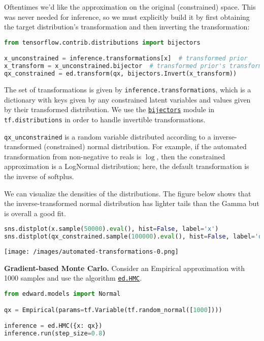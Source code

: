 Oftentimes we'd like the approximation on the original (constrained)
space. This was never needed for inference, so we must explicitly
build it by first obtaining the target distribution's transformation
and then inverting the transformation:

\begin{lstlisting}[language=Python]
from tensorflow.contrib.distributions import bijectors

x_unconstrained = inference.transformations[x]  # transformed prior
x_transform = x_unconstrained.bijector  # transformed prior's transformation
qx_constrained = ed.transform(qx, bijectors.Invert(x_transform))
\end{lstlisting}

The set of transformations is given by
\texttt{inference.transformations}, which is a dictionary with keys
given by any constrained latent variables and values given by their
transformed distribution. We use the
\href{https://www.tensorflow.org/versions/master/api_docs/python/tf/distributions/bijectors}{\texttt{bijectors}}
module in \texttt{tf.distributions} in order to handle invertible
transformations.

\texttt{qx_unconstrained} is a random variable distributed
according to a inverse-transformed (constrained) normal distribution.
For example, if the automated transformation from non-negative to
reals is $\log$, then the constrained approximation is a LogNormal
distribution; here, the default transformation is the inverse of
$\textrm{softplus}$.

We can visualize the densities of the distributions.
The figure below shows that the inverse-transformed normal
distribution has lighter tails than the Gamma but is overall a
good fit.

\begin{lstlisting}[language=Python]
sns.distplot(x.sample(50000).eval(), hist=False, label='x')
sns.distplot(qx_constrained.sample(100000).eval(), hist=False, label='qx')
\end{lstlisting}

\texttt{[image: /images/automated-transformations-0.png]}

\textbf{Gradient-based Monte Carlo.}
Consider an Empirical approximation with 1000 samples
and use the algorithm \href{/api/ed/HMC}{\texttt{ed.HMC}}.

\begin{lstlisting}[language=Python]
from edward.models import Normal

qx = Empirical(params=tf.Variable(tf.random_normal([1000])))

inference = ed.HMC({x: qx})
inference.run(step_size=0.8)
\end{lstlisting}

